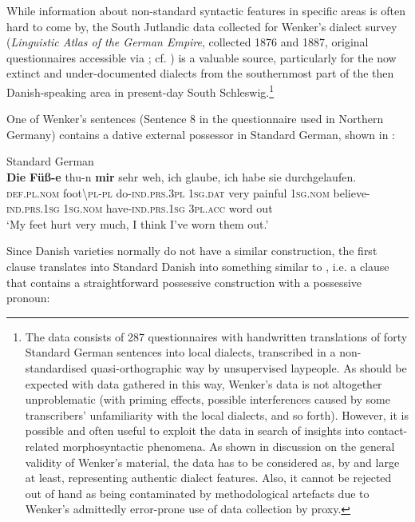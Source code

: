 \documentclass[output=paper]{langsci/langscibook}
\begin{document}
While information about non-standard syntactic features in specific areas is often hard to come by, the South Jutlandic data collected for Wenker’s dialect survey (\textit{Linguistic Atlas of the German Empire}, collected 1876 and 1887, original questionnaires accessible via \href{http://regionalsprache.de/regionalsprache.de}; cf. \citealt{Fleischer.2017}) is a valuable source, particularly for the now extinct and under-documented dialects from the southernmost part of the then Danish-speaking area in present-day South Schleswig.\footnote{The data consists of 287 questionnaires with handwritten translations of forty Standard German sentences into local dialects, transcribed in a non-standardised quasi-orthographic way by unsupervised laypeople. As should be expected with data gathered in this way, Wenker’s data is not altogether unproblematic (with priming effects, possible interferences caused by some transcribers’ unfamiliarity with the local dialects, and so forth). However, it is possible and often useful to exploit the data in search of insights into contact-related morphosyntactic phenomena. As shown in  discussion on the general validity of Wenker’s material, the data has to be considered as, by and large at least, representing authentic dialect features. Also, it cannot be rejected out of hand as being contaminated by methodological artefacts due to Wenker’s admittedly error-prone use of data collection by proxy.}

One of Wenker’s sentences (Sentence 8 in the questionnaire used in Northern Germany) contains a dative external possessor in Standard German, shown in :

\ea\label{ex:hoeder:22}
	Standard German\\
	\gll \textbf{Die} \textbf{Füß-e}{} thu-n \textbf{mir} sehr weh, ich glaube, ich habe sie durchgelaufen.\\
     \textsc{def.pl.nom} foot{\textbackslash}\textsc{pl-pl} do-\textsc{ind.prs.3pl} \textsc{1sg.dat} very painful 1\textsc{sg.nom} believe-\textsc{ind.prs.1sg} \textsc{1sg.nom} have-\textsc{ind.prs.1sg} \textsc{3pl.acc} word out\\
	\glt `My feet hurt very much, I think I’ve worn them out.'
\z

Since Danish varieties normally do not have a similar construction, the first clause translates into Standard Danish into something similar to , i.e. a clause that contains a straightforward possessive construction with a possessive pronoun:
\end{document}
